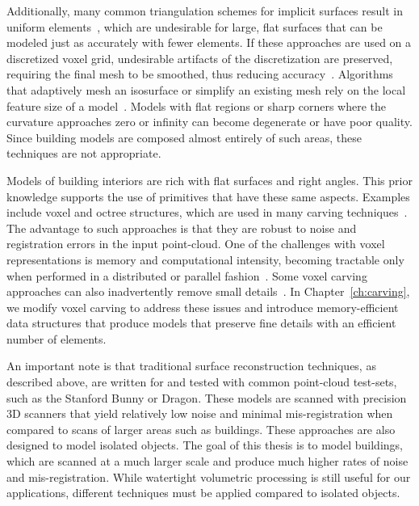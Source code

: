 \documentclass[12pt,onecolumn,oneside]{book}
\begin{document}
Additionally, many common triangulation schemes for implicit surfaces result in uniform elements~\cite{DualContouring,MarchingCubes}, which are undesirable for large, flat surfaces that can be modeled just as accurately with fewer elements.  If these approaches are used on a discretized voxel grid, undesirable artifacts of the discretization are preserved, requiring the final mesh to be smoothed, thus reducing accuracy~\cite{Carving}.  Algorithms that adaptively mesh an isosurface or simplify an existing mesh rely on the local feature size of a model~\cite{QEM,ProgressiveMesh,Isostuffing,AdaptiveMeshing}.  Models with flat regions or sharp corners where the curvature approaches zero or infinity can become degenerate or have poor quality.  Since building models are composed almost entirely of such areas, these techniques are not appropriate.

Models of building interiors are rich with flat surfaces and right angles.  This prior knowledge supports the use of primitives that have these same aspects.  Examples include voxel and octree structures, which are used in many carving techniques~\cite{OctreeSculpting,Carving,SpaceTime,VoxelSurfaceArea,Yang05}.  The advantage to such approaches is that they are robust to noise and registration errors in the input point-cloud.  One of the challenges with voxel representations is memory and computational intensity, becoming tractable only when performed in a distributed or parallel fashion~\cite{ParallelOctree}.  Some voxel carving approaches can also inadvertently remove small details~\cite{Carving}.  In Chapter~\ref{ch:carving}, we modify voxel carving to address these issues and introduce memory-efficient data structures that produce models that preserve fine details with an efficient number of elements.

An important note is that traditional surface reconstruction techniques, as described above, are written for and tested with common point-cloud test-sets, such as the Stanford Bunny or Dragon.  These models are scanned with precision 3D scanners that yield relatively low noise and minimal mis-registration when compared to scans of larger areas such as buildings.  These approaches are also designed to model isolated objects.  The goal of this thesis is to model buildings, which are scanned at a much larger scale and produce much higher rates of noise and mis-registration.  While watertight volumetric processing is still useful for our applications, different techniques must be applied compared to isolated objects.
\end{document}
